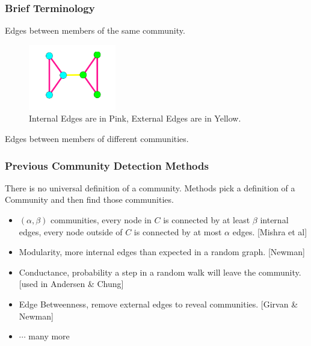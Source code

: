 \documentclass{beamer}
\begin{document}
\begin{frame}\frametitle{Brief Terminology}

\begin{definition}
Edges between members of the same community.
\end{definition}
\begin{figure}
\includegraphics[width=1.5in]{Figures/int_ext_edges_graph}
\caption{Internal Edges are in Pink, External Edges are in Yellow.}
\end{figure}
\begin{definition}
Edges between members of different communities.
\end{definition}
\end{frame}


\begin{frame}\frametitle{Previous Community Detection Methods}
There is no universal definition of a community.  Methods pick a definition of a Community and then find those communities.
\begin{itemize}
\item $(\alpha, \beta)$ communities, every node in $C$ is connected by at least $\beta$ internal edges, every node outside of $C$ is connected by at most $\alpha$ edges. [Mishra et al]
\item Modularity, more internal edges than expected in a random graph. [Newman]
\item Conductance, probability a step in a random walk will leave the community. [used in Andersen \& Chung]
\item Edge Betweenness, remove external edges to reveal communities. [Girvan \& Newman]
\item $\cdots$ many more
\end{itemize}

\end{frame}
\end{document}

